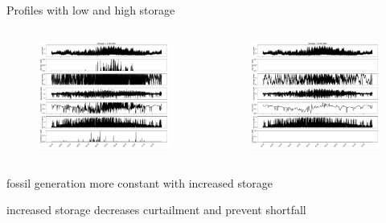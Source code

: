 \documentclass[aspectratio=169,11pt]{beamer}
\begin{document}
\begin{frame}{Profiles with low and high storage}
\begin{columns}
    \begin{column}{0.5\textwidth}
        \begin{figure}
            \centering
            \includegraphics[width=\columnwidth]{./figures/p4.pdf}
        \end{figure}
    \end{column}
    \begin{column}{0.5\textwidth}
        \begin{figure}
            \centering
            \includegraphics[width=\columnwidth]{./figures/p5.pdf}
        \end{figure}
    \end{column}
\end{columns}
\vfill
\BIT 
\item fossil generation more constant with increased storage
\item increased storage decreases curtailment and prevent shortfall
\EIT
\end{frame}
\end{document}
